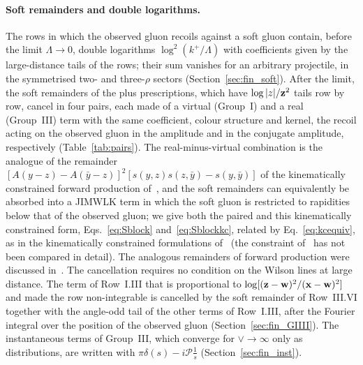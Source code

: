 \paragraph{Soft remainders and double logarithms.} The rows in which the observed gluon recoils against a soft gluon contain, before the limit $\Lambda\to0$, double logarithms $\log^2(k^+/\Lambda)$ with coefficients given by the large-distance tails of the rows; their sum vanishes for an arbitrary projectile, in the symmetrised two- and three-$\rho$ sectors (Section~\ref{sec:fin_soft}). After the limit, the soft remainders of the plus prescriptions, which have $\log|z|/\mathbf{z}^2$ tails row by row, cancel in four pairs, each made of a virtual (Group~I) and a real (Group~III) term with the same coefficient, colour structure and kernel, the recoil acting on the observed gluon in the amplitude and in the conjugate amplitude, respectively (Table~\ref{tab:pairs}). The real-minus-virtual combination is the analogue of the remainder $[A(y-z)-A(\bar y-z)]^2[s(y,z)s(z,\bar y)-s(y,\bar y)]$ of the kinematically constrained forward production of~\cite{Altinoluk:2014eka}, and the soft remainders can equivalently be absorbed into a JIMWLK term in which the soft gluon is restricted to rapidities below that of the observed gluon; we give both the paired and this kinematically constrained form, Eqs.~\eqref{eq:Sblock} and~\eqref{eq:Sblockkc}, related by Eq.~\eqref{eq:kcequiv}, as in the kinematically constrained formulations of~\cite{Altinoluk:2014eka,Ducloue:2016shw} (the constraint of~\cite{Ducloue:2016shw} has not been compared in detail). The analogous remainders of forward production were discussed in~\cite{Stasto:2013cha,Altinoluk:2014eka,Ducloue:2016shw}. The cancellation requires no condition on the Wilson lines at large distance. The term of Row~I.III that is proportional to $\log[(\mathbf{z}-\mathbf{w})^2/(\mathbf{x}-\mathbf{w})^2]$ and made the row non-integrable is cancelled by the soft remainder of Row~III.VI together with the angle-odd tail of the other terms of Row~I.III, after the Fourier integral over the position of the observed gluon (Section~\ref{sec:fin_GIIII}). The instantaneous terms of Group~III, which converge for $\vee\to\infty$ only as distributions, are written with $\pi\delta(s)-i\mathcal P\frac1s$ (Section~\ref{sec:fin_inst}).

